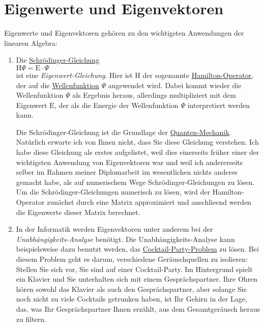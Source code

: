 \chapter{Eigenwerte und Eigenvektoren \label{chapter:eigenwerte}}
Eigenwerte und Eigenvektoren geh\"oren zu den wichtigsten Anwendungen der linearen Algebra:
\begin{enumerate}
\item Die \href{http://de.wikipedia.org/wiki/Schr\"odingergleichung}{Schr\"odinger-Gleichung}
      \\[0.2cm]
      \hspace*{1.3cm}
      $\mathrm{H} \Psi = \mathrm{E} \cdot \Psi$
      \\[0.2cm]
      ist eine {\emph{\color{blue}Eigenwert-Gleichung}}.  Hier ist $\mathrm{H}$ der sogenannte
      \href{http://de.wikipedia.org/wiki/Hamilton-Operator}{Hamilton-Operator}, der auf die
      \href{http://de.wikipedia.org/wiki/Wellenfunktion}{Wellenfunktion} $\Psi$ angewendet wird.
      Dabei kommt wieder die Wellenfunktion $\Psi$ als Ergebnis heraus, allerdings multipliziert mit
      dem Eigenwert $\mathrm{E}$, der als die Energie der Wellenfunktion $\Psi$ interpretiert werden kann.

      Die Schr\"odinger-Gleichung ist die Grundlage der \href{http://de.wikipedia.org/wiki/Quantenmechanik}{Quanten-Mechanik}.
      Nat\"urlich erwarte ich von Ihnen nicht, dass Sie diese Gleichung verstehen.  Ich habe diese
      Gleichung als erstes aufgelistet, weil dies einerseits fr\"uher einer der wichtigsten Anwendung von
      Eigenvektoren war und weil ich andererseits selber im Rahmen meiner Diplomarbeit im
      wesentlichen nichts anderes gemacht habe, als auf numerischem Wege Schr\"odinger-Gleichungen zu
      l\"osen.  Um die Schr\"odinger-Gleichungen numerisch zu l\"osen, wird der Hamilton-Operator zun\"achst
      durch eine Matrix approximiert und anschlie\3end werden die Eigenwerte dieser Matrix berechnet.
\item In der Informatik werden Eigenvektoren unter anderem bei der 
      {\emph{\color{blue}Unabh\"angigkeits-Analyse}} ben\"otigt.  Die Unabh\"angigkeits-Analyse
      kann beispielsweise dazu benutzt werden, das
      \href{http://research.ics.aalto.fi/ica/cocktail/cocktail_en.cgi}{Cocktail-Party-Problem} zu l\"osen.
      Bei diesem Problem geht es darum, verschiedene Ger\"auschquellen zu isolieren:  Stellen
      Sie sich vor, Sie sind auf einer Cocktail-Party.  Im Hintergrund spielt ein Klavier und Sie
      unterhalten sich mit einem Gespr\"achspartner.  Ihre Ohren h\"oren sowohl das Klavier als auch den
      Gespr\"achspartner, aber solange Sie noch nicht zu viele Cocktails getrunken haben, ist Ihr
      Gehirn in der Lage, das, was Ihr Gespr\"achspartner Ihnen erz\"ahlt, aus 
      dem Gesamtger\"ausch heraus zu filtern.  


\end{enumerate}
